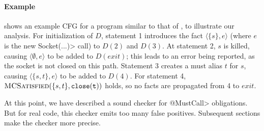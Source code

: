 \paragraph{Example}  shows an example CFG for a program
similar to that of , to illustrate our analysis.  For
initialization of $D$, statement 1 introduces the fact $\langle \{ s \}, e
\rangle$ (where $e$ is the \<new Socket(...)> call) to $D(2)$ and $D(3)$.  At
statement 2, $s$ is killed, causing $\langle \emptyset , e \rangle$ to be added
to $D(\mathit{exit})$; this leads to an error being reported, as the socket is
not closed on this path.  Statement 3 creates a must alias $t$ for $s$, causing
$\langle \{ s, t \}, e \rangle$ to be added to $D(4)$.  For statement 4,
$\textsc{MCSatisfied}(\{s,t\},\mathtt{close(t)})$ holds, so no facts are
propagated from 4 to $\mathit{exit}$.

At this point, we have described a sound checker for \<@MustCall> obligations.
But for real code, this checker emits too many false positives.  Subsequent
sections make the checker more precise.




